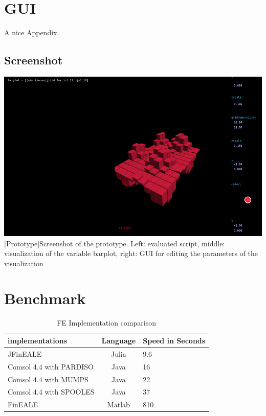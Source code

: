\begin{appendix}
\section{GUI}
A nice Appendix.

\subsection*{Screenshot}
\begin{minipage}{\linewidth}
    \centering
    \includegraphics[scale=2.0]{graphics/screenshot.png}
    [Prototype]{Screenshot of the prototype. Left: evaluated script, middle: visualization of the variable barplot, right: GUI for editing the parameters of the visualization}
    \label{app:screenshot}
\end{minipage}


\section{Benchmark}

\begin{table}[htb]
\centering
\caption{FE Implementation comparison}
    \sffamily 
    \begin{tabularx}{1.0\textwidth}{l | c | p{5cm}}
        \hline
        implementations         & Language  & Speed in Seconds \\
        \hline
        JFinEALE                & Julia     & 9.6   \\
        Comsol 4.4 with PARDISO & Java      & 16    \\
        Comsol 4.4 with MUMPS   & Java      & 22    \\ 
        Comsol 4.4 with SPOOLES & Java      & 37    \\ 
        FinEALE                 & Matlab    & 810   \\
        \hline
    \end{tabularx} 
    \normalfont
    \label{table:FEComparison}
\end{table}


\end{appendix}

